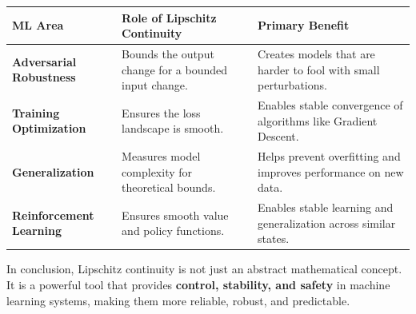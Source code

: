 \begin{notechapter}
\begin{table}[h!]
\centering
\begin{tabular}{@{}p{} p{} p{}@{}}
\toprule
\textbf{ML Area} & \textbf{Role of Lipschitz Continuity} & \textbf{Primary Benefit} \\
\midrule
\textbf{Adversarial Robustness} & Bounds the output change for a bounded input change. & Creates models that are harder to fool with small perturbations. \\
\textbf{Training Optimization} & Ensures the loss landscape is smooth. & Enables stable convergence of algorithms like Gradient Descent. \\
\textbf{Generalization} & Measures model complexity for theoretical bounds. & Helps prevent overfitting and improves performance on new data. \\
\textbf{Reinforcement Learning} & Ensures smooth value and policy functions. & Enables stable learning and generalization across similar states. \\
\bottomrule
\end{tabular}
\end{table}

\vspace{1em}
In conclusion, Lipschitz continuity is not just an abstract mathematical concept. It is a powerful tool that provides \textbf{control, stability, and safety} in machine learning systems, making them more reliable, robust, and predictable.
\end{notechapter}
